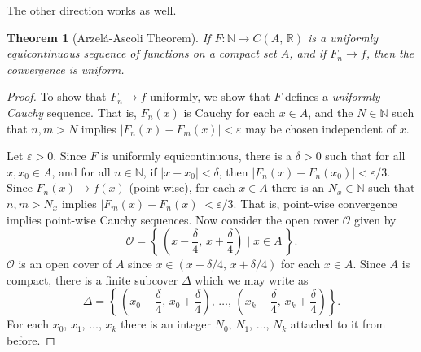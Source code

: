 \documentclass{article}
\theoremstyle{normal}
\newtheorem{theorem}{Theorem}
\begin{document}
        \color{black}
    \fi
    The other direction works as well.
    \begin{theorem}[Arzel\'{a}-Ascoli Theorem]
        If $F:\mathbb{N}\rightarrow{C}(A,\,\mathbb{R})$ is a uniformly
        equicontinuous sequence of functions on a compact set $A$, and if
        $F_{n}\rightarrow{f}$, then the convergence is uniform.
    \end{theorem}
    \begin{proof}
        To show that $F_{n}\rightarrow{f}$ uniformly, we show that $F$ defines
        a \textit{uniformly Cauchy} sequence. That is, $F_{n}(x)$ is Cauchy
        for each $x\in{A}$, and the $N\in\mathbb{N}$ such that
        $n,m>N$ implies $|F_{n}(x)-F_{m}(x)|<\varepsilon$ may be chosen
        independent of $x$.
        \par\hfill\par
        Let $\varepsilon>0$.
        Since $F$ is uniformly equicontinuous, there is a $\delta>0$ such
        that for all $x,x_{0}\in{A}$, and for all $n\in\mathbb{N}$, if
        $|x-x_{0}|<\delta$, then $|F_{n}(x)-F_{n}(x_{0})|<\varepsilon/3$.
        Since $F_{n}(x)\rightarrow{f}(x)$ (point-wise), for each
        $x\in{A}$ there is an $N_{x}\in\mathbb{N}$ such that
        $n,m>N_{x}$ implies $|F_{m}(x)-F_{n}(x)|<\varepsilon/3$.
        That is, point-wise convergence implies point-wise Cauchy sequences.
        Now consider the open cover $\mathcal{O}$ given by
        \begin{equation}
            \mathcal{O}
            =
            \left\{\,
                \left(x-\frac{\delta}{4},\,x+\frac{\delta}{4}\right)
                \;\Big|\;
                x\in{A}\,
            \right\}.
        \end{equation}
        $\mathcal{O}$ is an open cover of $A$ since
        $x\in(x-\delta/4,\,x+\delta/4)$ for each $x\in{A}$.
        Since $A$ is compact, there is a finite subcover $\Delta$ which we
        may write as
        \begin{equation}
            \Delta
            =
            \left\{\,
                \left(
                    x_{0}-\frac{\delta}{4},\,x_{0}+\frac{\delta}{4}
                \right),\,
                \dots,\,
                \left(
                    x_{k}-\frac{\delta}{4},\,x_{k}+\frac{\delta}{4}
                \right)
            \right\}.
        \end{equation}
        For each $x_{0}$, $x_{1}$, $\dots$, $x_{k}$ there is an integer
        $N_{0}$, $N_{1}$, $\dots$, $N_{k}$ attached to it from before.

\end{proof}
\end{document}
